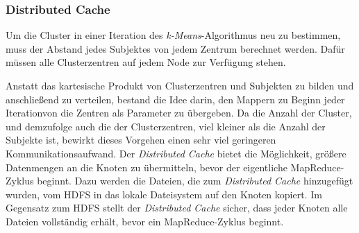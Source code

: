 \documentclass[a4paper]{llncs}
\begin{document}

\subsubsection{Distributed Cache}

Um die Cluster in einer Iteration des \emph{k-Means}-Algorithmus neu zu bestimmen, muss der Abstand jedes Subjektes von jedem Zentrum berechnet werden. Dafür müssen alle Clusterzentren auf jedem Node zur Verfügung stehen.

Anstatt das kartesische Produkt von Clusterzentren und Subjekten zu bilden und anschließend zu verteilen, bestand die Idee darin, den Mappern zu Beginn jeder Iterationvon die Zentren als Parameter zu übergeben. Da die Anzahl der Cluster, und demzufolge auch die der Clusterzentren, viel kleiner als die Anzahl der Subjekte ist, bewirkt dieses Vorgehen einen sehr viel geringeren Kommunikationsaufwand.
Der \emph{Distributed Cache} bietet die Möglichkeit, größere Datenmengen an die Knoten zu übermitteln, bevor der eigentliche MapReduce-Zyklus beginnt. Dazu werden die Dateien, die zum \emph{Distributed Cache} hinzugefügt wurden, vom HDFS in das lokale Dateisystem auf den Knoten kopiert. Im Gegensatz zum HDFS stellt der \emph{Distributed Cache} sicher, dass jeder Knoten alle Dateien vollständig erhält, bevor ein MapReduce-Zyklus beginnt.

\end{document}
